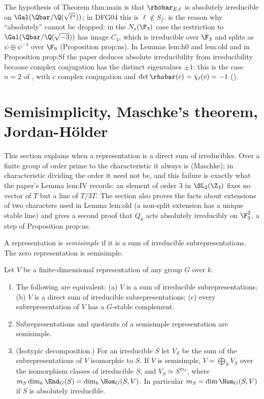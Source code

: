 \begin{paperlink}
The hypothesis of Theorem thm:main is that $\rhobar_{E,\ell}$ is absolutely irreducible on $\Gal(\Qbar/\Q(\sqrt{\ell^*}))$; in DFG04 this is $\ell\notin S_f$.
 is the reason why ``absolutely'' cannot be dropped: in the $N_s(\F_3)$ case the restriction to $\Gal(\Qbar/\Q(\sqrt{-3}))$ has
image $C_4$, which is irreducible over $\F_3$ and splits as $\psi\oplus\psi^{-1}$ over $\F_9$ (Proposition prop:ns). In Lemmas lem:h0 and lem:old and in
Proposition prop:Sf the paper deduces absolute irreducibility from irreducibility because complex conjugation has the distinct
eigenvalues $\pm1$: this is the case $n=2$ of , with $c$ complex conjugation and $\det\rhobar(c)=\bar\chi_\ell(c)=-1$
().
\end{paperlink}

\section{Semisimplicity, Maschke's theorem, Jordan-H\"older}\label{sec:reps:semisimple}

This section explains when a representation is a direct sum of irreducibles. Over a finite group of order prime to the
characteristic it always is (Maschke); in characteristic dividing the order it need not be, and this failure is exactly what the
paper's Lemma lem:IV records: an element of order $3$ in $\SL_2(\Z_3)$ fixes no vector of $T$ but a line of $T/3T$. The section also
proves the facts about extensions of two characters used in Lemma lem:old (a non-split extension has a unique stable line) and
gives a second proof that $Q_8$ acts absolutely irreducibly on $\F_3^2$, a step of Proposition prop:ns.

\begin{definition}\label{def:reps:semisimple}
A representation is \emph{semisimple} if it is a sum of irreducible subrepresentations. The zero representation is semisimple.
\end{definition}

\begin{proposition}\label{prop:reps:semisimple}
Let $V$ be a finite-dimensional representation of any group $G$ over $k$.
\begin{enumerate}[label=(\roman*)]
\item The following are equivalent: (a) $V$ is a sum of irreducible subrepresentations; (b) $V$ is a direct sum of irreducible
subrepresentations; (c) every subrepresentation of $V$ has a $G$-stable complement.
\item Subrepresentations and quotients of a semisimple representation are semisimple.
\item (Isotypic decomposition.) For an irreducible $S$ let $V_S$ be the sum of the subrepresentations of $V$ isomorphic to $S$. If $V$
is semisimple, $V=\bigoplus_SV_S$ over the isomorphism classes of irreducible $S$, and $V_S\simeq S^{m_S}$, where $m_S\dim_k\End_G(S)=\dim_k\Hom_G(S,V)$.
In particular $m_S=\dim\Hom_G(S,V)$ if $S$ is absolutely irreducible.
\end{enumerate}
\end{proposition}

